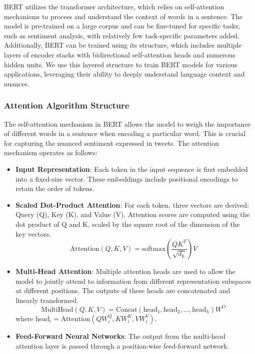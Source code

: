 \documentclass[12pt]{article}
\begin{document}
BERT utilizes the transformer architecture, which relies on self-attention mechanisms to process and understand the context of words in a sentence. The model is pre-trained on a large corpus and can be fine-tuned for specific tasks, such as sentiment analysis, with relatively few task-specific parameters added. Additionally, BERT can be trained using its structure, which includes multiple layers of encoder stacks with bidirectional self-attention heads and numerous hidden units. We use this layered structure to train BERT models for various applications, leveraging their ability to deeply understand language context and nuances.

\subsubsection{Attention Algorithm Structure}
The self-attention mechanism in BERT allows the model to weigh the importance of different words in a sentence when encoding a particular word. This is crucial for capturing the nuanced sentiment expressed in tweets. The attention mechanism operates as follows:

\begin{itemize}
    \item \textbf{Input Representation}: Each token in the input sequence is first embedded into a fixed-size vector. These embeddings include positional encodings to retain the order of tokens.
    \item \textbf{Scaled Dot-Product Attention}: For each token, three vectors are derived: Query (Q), Key (K), and Value (V). Attention scores are computed using the dot product of Q and K, scaled by the square root of the dimension of the key vectors.
    \begin{equation}
    \text{Attention}(Q, K, V) = \text{softmax}\left(\frac{QK^T}{\sqrt{d_k}}\right) V
    \end{equation}
    \item \textbf{Multi-Head Attention}: Multiple attention heads are used to allow the model to jointly attend to information from different representation subspaces at different positions. The outputs of these heads are concatenated and linearly transformed.
    \begin{equation}
    \text{MultiHead}(Q, K, V) = \text{Concat}(\text{head}_1, \text{head}_2, \ldots, \text{head}_h)W^O
    \end{equation}
    where $\text{head}_i = \text{Attention}(QW_i^Q, KW_i^K, VW_i^V)$.
    \item \textbf{Feed-Forward Neural Networks}: The output from the multi-head attention layer is passed through a position-wise feed-forward network.
\end{itemize}
\end{document}
